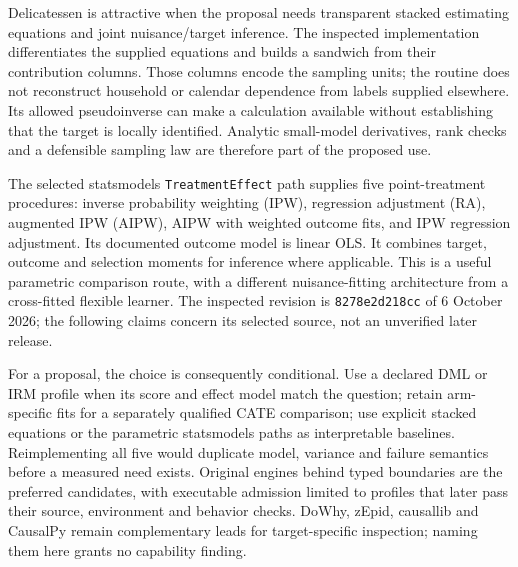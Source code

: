 Delicatessen is attractive when the proposal needs transparent stacked
estimating equations and joint nuisance/target inference. The inspected
implementation differentiates the supplied equations and builds a sandwich
from their contribution columns. Those columns encode the sampling units;
the routine does not reconstruct household or calendar dependence from
labels supplied elsewhere. Its allowed pseudoinverse can make a calculation
available without establishing that the target is locally identified.
Analytic small-model derivatives, rank checks and a defensible sampling law
are therefore part of the proposed use.\citep{v13_sw_delicatessen,v131_sw_delicatessen}

The selected statsmodels \texttt{TreatmentEffect} path supplies five
point-treatment procedures: inverse probability weighting (IPW), regression
adjustment (RA), augmented IPW (AIPW), AIPW with weighted outcome fits, and
IPW regression adjustment. Its documented outcome model is linear OLS.
It combines target, outcome and selection moments for inference where
applicable. This is a useful parametric comparison route, with a different
nuisance-fitting architecture from a cross-fitted flexible learner.
The inspected revision is \texttt{8278e2d218cc} of 6 October 2026; the
following claims concern its selected source, not an unverified later
release.\citep{v13_sw_statsmodels,exec20_python_effect_source}

For a proposal, the choice is consequently conditional. Use a declared DML
or IRM profile when its score and effect model match the question; retain
arm-specific fits for a separately qualified CATE comparison; use explicit
stacked equations or the parametric statsmodels paths as interpretable
baselines. Reimplementing all five would duplicate model, variance and
failure semantics before a measured need exists. Original engines behind
typed boundaries are the preferred candidates, with executable admission
limited to profiles that later pass their source, environment and behavior
checks. DoWhy, zEpid, causallib and CausalPy remain complementary leads for
target-specific inspection; naming them here grants no capability finding.

